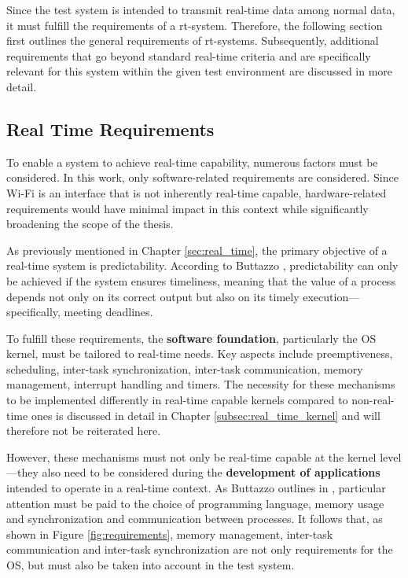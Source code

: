 Since the test system is intended to transmit real-time data among normal data, it must fulfill the requirements of a \ac{rt-system}. 
Therefore, the following section first outlines the general requirements of \acp{rt-system}. 
Subsequently, additional requirements that go beyond standard real-time criteria and are specifically relevant for this system within the given test environment are discussed in more detail.

\subsection{Real Time Requirements}
To enable a system to achieve real-time capability, numerous factors must be considered. 
In this work, only software-related requirements are considered.
Since Wi-Fi is an interface that is not inherently real-time capable, hardware-related requirements would have minimal impact in this context while significantly broadening the scope of the thesis.

As previously mentioned in Chapter \ref{sec:real_time}, the primary objective of a real-time system is predictability. 
According to Buttazzo \cite[p. 10]{Buttazzo_2024}, predictability can only be achieved if the system ensures timeliness, meaning that the value of a process depends not only on its correct output but also on its timely execution—specifically, meeting deadlines.

To fulfill these requirements, the \textbf{software foundation}, particularly the \ac{OS} kernel, must be tailored to real-time needs.
Key aspects include preemptiveness, scheduling, inter-task synchronization, inter-task communication, memory management, interrupt handling and timers.
The necessity for these mechanisms to be implemented differently in real-time capable kernels compared to non-real-time ones is discussed in detail in Chapter \ref{subsec:real_time_kernel} and will therefore not be reiterated here.

However, these mechanisms must not only be real-time capable at the kernel level—they also need to be considered during the \textbf{development of applications} intended to operate in a real-time context. 
As Buttazzo outlines in \cite[p. 13 - 20]{Buttazzo_2024}, particular attention must be paid to the choice of programming language, memory usage and synchronization and communication between processes.
It follows that, as shown in Figure \ref{fig:requirements}, memory management, inter-task communication and inter-task synchronization are not only requirements for the \ac{OS}, but must also be taken into account in the test system.

